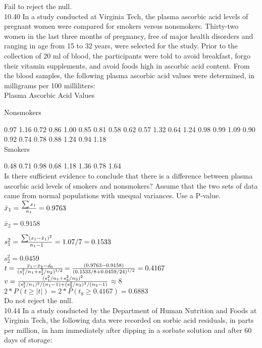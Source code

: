 Fail to reject the null. \\

10.40 In a study conducted at Virginia Tech, the plasma ascorbic acid levels of pregnant women were compared for smokers versus nonsmokers. Thirty-two women in the last three months of pregnancy, free of major health disorders and ranging in age from 15 to 32 years, were selected for the study. Prior to the collection of 20 ml of blood, the participants were told to avoid breakfast, forgo their vitamin supplements, and avoid foods high in ascorbic acid content. From the blood samples, the following plasma ascorbic acid values were determined, in milligrams per 100 milliliters: \\

Plasma Ascorbic Acid Values

Nonsmokers

0.97
1.16
0.72
0.86
1.00
0.85
0.81
0.58
0.62
0.57
1.32
0.64
1.24
0.98
0.99
1.09
0.90
0.92
0.74
0.78
0.88
1.24
0.94
1.18 \\

Smokers

0.48
0.71
0.98
0.68
1.18
1.36
0.78
1.64 \\

Is there sufficient evidence to conclude that there is a difference between plasma ascorbic acid levels of smokers and nonsmokers? Assume that the two sets of data came from normal populations with unequal variances. Use a P-value. \\

$\bar{x}_1 = \frac{\sum x_1}{n_1} = 0.9763$

$\bar{x}_2 = 0.9158$

$s_1^2 = \frac{\sum (x_1 - \bar{x}_1)^2}{n_1-1} = 1.07/7 = 0.1533$

$s_2^2 = 0.0459$ \\


$t = \frac{\bar{x}_1 - \bar{x}_2 - d_0}{(s_1^2/n_1 + s_2^2/n_2)^{1/2}}$$ = \frac{(0.9763 - 0.9158)}{(0.1533/8 + 0.0459/24)^{1/2}} = 0.4167 $ \\

$v = \frac{(s_1^2/n_1+s_2^2/n_2)^2}{(s_1^2/n_1)^2/(n_1-1) + (s_2^2/n_2)^2/(n_2-1)}$$\approx 8$ \\

$2*P(t \geq |t|) = 2*P(t_8 \geq 0.4167) = 0.6883$ \\

Do not reject the null. \\

10.44 In a study conducted by the Department of Human Nutrition and Foods at Virginia Tech, the following data were recorded on sorbic acid residuals, in parts per million, in ham immediately after dipping in a sorbate solution and after 60 days of storage: \\

